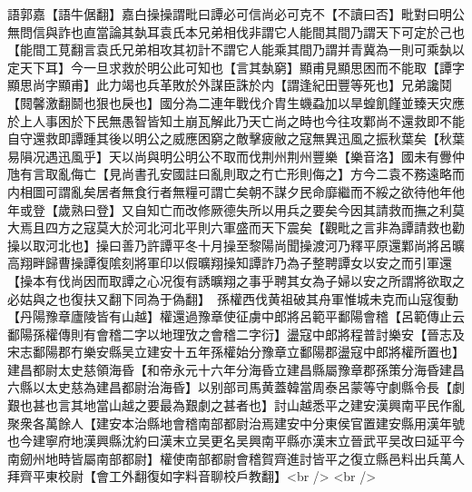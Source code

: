 語郭嘉【語牛倨翻】嘉白操操謂毗曰譚必可信尚必可克不【不讀曰否】毗對曰明公無問信與詐也直當論其埶耳袁氏本兄弟相伐非謂它人能間其間乃謂天下可定於己也【能間工莧翻言袁氏兄弟相攻其初計不謂它人能乘其間乃謂并青冀為一則可乘埶以定天下耳】今一旦求救於明公此可知也【言其埶窮】顯甫見顯思困而不能取【譚字顯思尚字顯甫】此力竭也兵革敗於外謀臣誅於内【謂逢紀田豐等死也】兄弟讒鬩【䦧馨激翻鬬也狠也戾也】國分為二連年戰伐介胄生蟣蝨加以旱蝗飢饉並臻天灾應於上人事困於下民無愚智皆知土崩瓦解此乃天亡尚之時也今往攻鄴尚不還救即不能自守還救即譚踵其後以明公之威應困窮之敵擊疲敝之寇無異迅風之振秋葉矣【秋葉易隕况遇迅風乎】天以尚與明公明公不取而伐荆州荆州豐樂【樂音洛】國未有釁仲虺有言取亂侮亡【見尚書孔安國註曰亂則取之冇亡形則侮之】方今二袁不務遠略而内相圖可謂亂矣居者無食行者無糧可謂亡矣朝不謀夕民命靡繼而不綏之欲待他年他年或登【歲熟曰登】又自知亡而改修厥德失所以用兵之要矣今因其請救而撫之利莫大焉且四方之寇莫大於河北河北平則六軍盛而天下震矣【觀毗之言非為譚請救也勸操以取河北也】操曰善乃許譚平冬十月操至黎陽尚聞操渡河乃釋平原還鄴尚將呂曠高翔畔歸曹操譚復隂刻將軍印以假曠翔操知譚詐乃為子整聘譚女以安之而引軍還【操本有伐尚因而取譚之心况復有誘曠翔之事乎聘其女為子婦以安之所謂將欲取之必姑與之也復扶又翻下同為于偽翻】　孫權西伐黄祖破其舟軍惟城未克而山寇復動【丹陽豫章廬陵皆有山越】權還過豫章使征虜中郎將呂範平鄱陽會稽【呂範傳止云鄱陽孫權傳則有會稽二字以地理攷之會稽二字衍】盪寇中郎將程普討樂安【晉志及宋志鄱陽郡冇樂安縣吴立建安十五年孫權始分豫章立鄱陽郡盪寇中郎將權所置也】建昌都尉太史慈領海昏【和帝永元十六年分海昏立建昌縣屬豫章郡孫策分海昏建昌六縣以太史慈為建昌都尉治海昏】以别部司馬黄蓋韓當周泰呂蒙等守劇縣令長【劇艱也甚也言其地當山越之要最為艱劇之甚者也】討山越悉平之建安漢興南平民作亂聚衆各萬餘人【建安本治縣地會稽南部都尉治焉建安中分東侯官置建安縣用漢年號也今建寧府地漢興縣沈約曰漢末立吴更名吴興南平縣亦漢末立晉武平吴改曰延平今南劒州地時皆屬南部都尉】權使南部都尉會稽賀齊進討皆平之復立縣邑料出兵萬人拜齊平東校尉【會工外翻復如字料音聊校戶教翻】<br />
<br />
